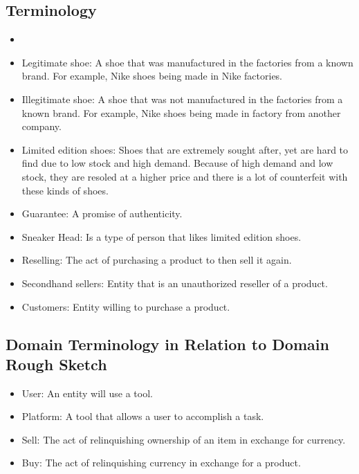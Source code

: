 \subsection{Terminology}
\begin{itemize}
  \item{}
  \item Legitimate shoe: A shoe that was manufactured in the factories from a known brand. For example, Nike shoes being made in Nike factories.
  \item Illegitimate shoe: A shoe that was not manufactured in the factories from a known brand. For example, Nike shoes being made in factory from another company.
  \item Limited edition shoes: Shoes that are extremely sought after, yet are hard to find due to low stock and high demand. Because of high demand and low stock, they are resoled at a higher price and there is a lot of counterfeit with these kinds of shoes.
  \item Guarantee: A promise of authenticity.
  \item Sneaker Head: Is a type of person that likes limited edition shoes.
  \item Reselling: The act of purchasing a product to then sell it again.
  \item Secondhand sellers: Entity that is an unauthorized reseller of a product.
  \item Customers: Entity willing to purchase a product.
\end{itemize}
\subsection{Domain Terminology in Relation to Domain Rough Sketch}
\begin{itemize}
  \item User: An entity will use a tool.
  \item Platform: A tool that allows a user to accomplish a task.
  \item Sell: The act of relinquishing ownership of an item in exchange for currency.
  \item Buy: The act of relinquishing currency in exchange for a product.
\end{itemize}
